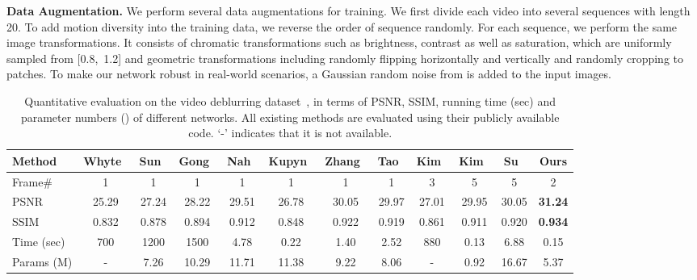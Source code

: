\documentclass[10pt,twocolumn,letterpaper]{article}
\begin{document}
\noindent \textbf{Data Augmentation.}
We perform several data augmentations for training.
We first divide each video into several sequences with length 20.
To add motion diversity into the training data, we reverse the order of sequence randomly.
For each sequence, we perform the same image transformations.
It consists of chromatic transformations such as brightness, contrast as well as saturation, which are uniformly sampled from [0.8,~1.2] and geometric transformations including randomly flipping horizontally and vertically and randomly cropping to  patches.
To make our network robust in real-world scenarios, a Gaussian random noise from  is added to the input images.
\begin{table*}
\centering
\caption{Quantitative evaluation on the video deblurring dataset~\cite{su2017deep}, in terms of PSNR, SSIM,
running time (sec) and parameter numbers () of different networks.
All existing methods are evaluated using their publicly available code.
`-' indicates that it is not available.}
\vspace{-1mm}
\resizebox{\linewidth}{!} {
	\begin{tabular}{lccccccc|cccc}
		\toprule
		Method
		& Whyte~\cite{whyte2012non}
		& Sun~\cite{sun2015learning}
		& Gong~\cite{gong2017motion}
		& Nah~\cite{nah2017deep}
		& Kupyn~\cite{kupyn2018deblurgan}
		& Zhang~\cite{zhang2018dynamic}
		& Tao~\cite{tao2018scale}
		& Kim~\cite{hyun2015generalized}
		& Kim~\cite{hyun2017online}
		& Su~\cite{su2017deep}
		& Ours\\
		\midrule
		Frame\#  & 1           & 1           & 1           & 1           & 1           & 1            & 1             & 3             & 5          & 5          & 2  \\
		PSNR     & 25.29      & 27.24      & 28.22      & 29.51      & 26.78     & 30.05  & 29.97  &  27.01  & 29.95  & 30.05 & \bf{31.24}\\
		SSIM      & 0.832      & 0.878      & 0.894      & 0.912    & 0.848      & 0.922   & 0.919   &  0.861 & 0.911 &  0.920  &  \bf{0.934}\\
		\midrule
		Time (sec)     & 700      & 1200      & 1500       & 4.78           & 0.22       & 1.40     & 2.52     &  880 &  0.13  &  6.88  & 0.15\\
		Params (M)    & -          & 7.26        & 10.29      & 11.71     & 11.38      & 9.22      & 8.06    &  - &  0.92  & 16.67  & 5.37\\
		\bottomrule
	\end{tabular}
}
\label{tab:psnr_time_size}
\end{table*}
\end{document}

